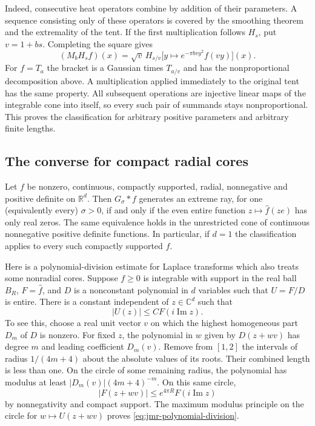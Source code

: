 \documentclass[11pt,a4paper]{article}
\numberwithin{equation}{section}
\begin{document}
Indeed, consecutive heat operators combine by addition of their parameters. A sequence consisting only of these operators is covered by the smoothing theorem and the extremality of the tent. If the first multiplication follows $H_s$, put $v=1+bs$. Completing the square gives
\[
 (M_b H_s f)(x)=\sqrt v\,H_{s/v}\bigl[y\mapsto e^{-\pi b v y^2} f(vy)\bigr](x).
\]
For $f=T_a$ the bracket is a Gaussian times $T_{a/v}$ and has the nonproportional decomposition above. A multiplication applied immediately to the original tent has the same property. All subsequent operations are injective linear maps of the integrable cone into itself, so every such pair of summands stays nonproportional. This proves the classification for arbitrary positive parameters and arbitrary finite lengths.

\subsection{The converse for compact radial cores}
Let $f$ be nonzero, continuous, compactly supported, radial, nonnegative
and positive definite on $\mathbb R^d$. Then $G_\sigma*f$ generates an
extreme ray, for one (equivalently every) $\sigma>0$, if and only if
the even entire function $z\mapsto\widehat f(ze)$ has only real zeros.
The same equivalence holds in the unrestricted cone of continuous
nonnegative positive definite functions. In particular, if $d=1$ the
classification applies to every such compactly supported $f$.

Here is a polynomial-division estimate for Laplace transforms which
also treats some nonradial cores. Suppose $f\ge0$ is integrable with
support in the real ball $B_R$, $F=\widehat f$, and $D$ is a nonconstant
polynomial in $d$ variables such that $U=F/D$ is entire. There is a
constant independent of $z\in\mathbb C^d$ such that
\begin{equation}
 |U(z)|\le C F(i\operatorname{Im}z).
 \label{eq:jmr-polynomial-division}
\end{equation}
To see this, choose a real unit vector $v$ on which the highest homogeneous
part $D_m$ of $D$ is nonzero. For fixed $z$, the polynomial in $w$ given
by $D(z+wv)$ has degree $m$ and leading coefficient $D_m(v)$. Remove
from $[1,2]$ the intervals of radius $1/(4m+4)$ about the absolute values
of its roots. Their combined length is less than one. On the circle
of some remaining radius, the polynomial has modulus at least
$|D_m(v)|(4m+4)^{-m}$. On this same circle,
\[
 |F(z+wv)|\le e^{4\pi R}F(i\operatorname{Im}z)
\]
by nonnegativity and compact support. The maximum modulus principle
on the circle for $w\mapsto U(z+wv)$ proves
\eqref{eq:jmr-polynomial-division}.
\end{document}

